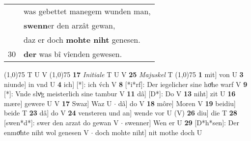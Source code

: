 \documentclass[8pt,a4paper,notitlepage]{article}
\begin{document}
\begin{table}[ht]
\begin{minipage}[t]{0.5\linewidth}
\begin{tabular}{rl}
 & was gebettet manegem wunden man,\\ 
 & \textbf{swenn}er den arzât gewan,\\ 
 & daz er doch \textbf{mohte niht} genesen.\\ 
30 & \textbf{der} was bî vîenden gewesen.\\ 
\end{tabular}
\scriptsize
\line(1,0){75} \newline
T U V \newline
\line(1,0){75} \newline
\textbf{17} \textit{Initiale} T U V  \textbf{25} \textit{Majuskel} T  \newline
\line(1,0){75} \newline
\textbf{1} mit] von U \textbf{3} niunde] in vnd U \textbf{4} ich] [*]: ich v́ch V \textbf{8} [*i*rf]: Der iegelicher sine hoͤhe warf V \textbf{9} [*]: Vnde slvͦg meisterlich sine tambur V \textbf{11} dâ] [D*]: Do V \textbf{13} niht] zit U \textbf{16} mære] gewere U V \textbf{17} Swaz] Waz U  $\cdot$ dâ] do V \textbf{18} môre] Moren V \textbf{19} beidiu] beide T \textbf{23} dâ] do V \textbf{24} vensteren und an] wende vor U (V) \textbf{26} diu] die T \textbf{28} [swen*d*]: swer den arzat do gewan V  $\cdot$ swenner] Wen er U \textbf{29} [D*h*sen]: Der enmoͤhte niht wol genesen V  $\cdot$ doch mohte niht] nit mothe doch U \newline
\end{minipage}
\end{table}
\end{document}
